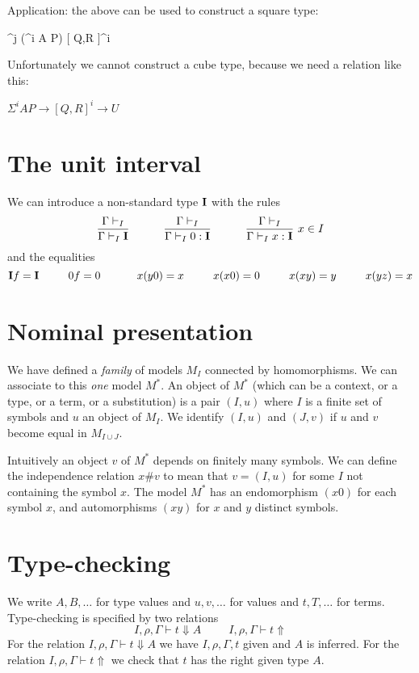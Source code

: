 \documentclass[10pt,a4paper]{article}
\newcommand\CSig[1]{\Sigma^{#1}}
\newcommand\linepred[3]{[ #2,#3 ]^{#1}}
\newcommand{\UI}{{\bf I}}
\begin{document}
Application: the above can be used to construct a square type:

          {\CSig j {(\CSig i A P)} \linepred i Q R}

Unfortunately we cannot construct a cube type, because we need a relation like this:

$\CSig i A P → \linepred i Q R → U$

\section{The unit interval}
 
 We can introduce a non-standard type $\UI$ with the rules
$$
\frac{\Gamma\vdash_I}{\Gamma\vdash_I \UI}~~~~~~~~~\frac{\Gamma\vdash_I}{\Gamma\vdash_I 0:\UI}~~~~~~~~~
\frac{\Gamma\vdash_I}{\Gamma\vdash_I x:\UI}~{x\in I}
$$
and the equalities
$$
\UI f = \UI~~~~~~~~0f = 0~~~~~~~~~~x(y0) = x~~~~~~~~x(x0) = 0~~~~~~~~x(xy) = y~~~~~~~~x(yz) = x
$$



\section{Nominal presentation}

 We have defined a {\em family} of models $M_I$ connected by homomorphisms.
We can associate to this {\em one} model $M^*$. An object of $M^*$ (which can
be a context, or a type, or a term, or a substitution) is a pair $(I,u)$
where $I$ is a finite set of symbols and $u$ an object of $M_I$. We identify
$(I,u)$ and $(J,v)$ if $u$ and $v$ become equal in $M_{I\cup J}$.

\medskip

 Intuitively an object $v$ of $M^*$ depends on finitely many symbols. We can 
define the independence relation $x\#v$ to mean that $v = (I,u)$ for some $I$
not containing the symbol $x$.
The model $M^*$ has an endomorphism $(x0)$ for each symbol $x$, and automorphisms
$(xy)$ for $x$ and $y$ distinct symbols.

\section{Type-checking}

 We write $A,B,\dots$ for type values and $u,v,\dots$ for values and $t,T,\dots$ for terms.
Type-checking is specified by two relations
$$
I,\rho,\Gamma\vdash t\Downarrow A~~~~~~~~~~~I,\rho,\Gamma\vdash t\Uparrow
$$
For the relation $I,\rho,\Gamma\vdash t\Downarrow A$ we have $I,\rho,\Gamma,t$ given and
$A$ is inferred. For the relation $I,\rho,\Gamma\vdash t\Uparrow$ we check that $t$ has
the right given type $A$.
\end{document}
